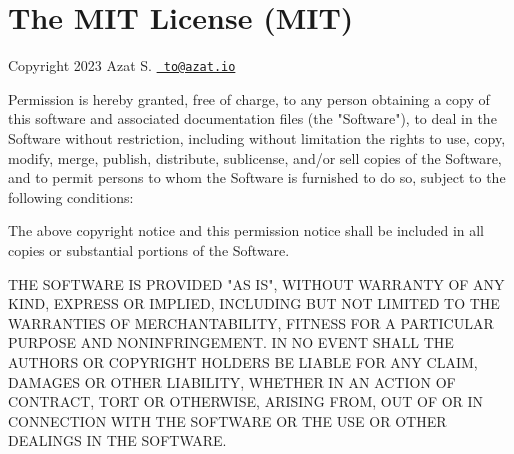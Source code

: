\chapter{The MIT License (MIT)}
\hypertarget{md_node__modules_2eslint-plugin-perfectionist_2license}{}\label{md_node__modules_2eslint-plugin-perfectionist_2license}
\label{md_node__modules_2eslint-plugin-perfectionist_2license_autotoc_md14089}%
%


Copyright 2023 Azat S. \href{mailto:to@azat.io}{\texttt{ to@azat.\+io}}

Permission is hereby granted, free of charge, to any person obtaining a copy of this software and associated documentation files (the "{}\+Software"{}), to deal in the Software without restriction, including without limitation the rights to use, copy, modify, merge, publish, distribute, sublicense, and/or sell copies of the Software, and to permit persons to whom the Software is furnished to do so, subject to the following conditions\+:

The above copyright notice and this permission notice shall be included in all copies or substantial portions of the Software.

THE SOFTWARE IS PROVIDED "{}\+AS IS"{}, WITHOUT WARRANTY OF ANY KIND, EXPRESS OR IMPLIED, INCLUDING BUT NOT LIMITED TO THE WARRANTIES OF MERCHANTABILITY, FITNESS FOR A PARTICULAR PURPOSE AND NONINFRINGEMENT. IN NO EVENT SHALL THE AUTHORS OR COPYRIGHT HOLDERS BE LIABLE FOR ANY CLAIM, DAMAGES OR OTHER LIABILITY, WHETHER IN AN ACTION OF CONTRACT, TORT OR OTHERWISE, ARISING FROM, OUT OF OR IN CONNECTION WITH THE SOFTWARE OR THE USE OR OTHER DEALINGS IN THE SOFTWARE. 
